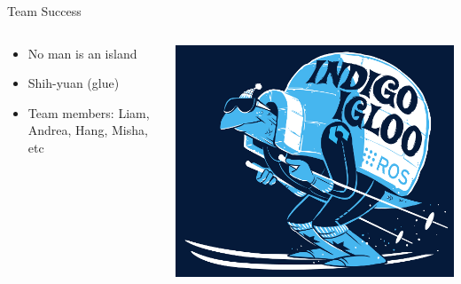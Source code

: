 \documentclass{beamer}
\begin{document}
\begin{frame}{Team Success}
\begin{columns}
	\begin{column}{0.55\textwidth}
		\begin{itemize}
			\item No man is an island
			\item \alert{Shih-yuan} (glue)
\item Team members: Liam, Andrea, Hang, Misha, etc
		\end{itemize}
	\end{column}
	\begin{column}{0.45\textwidth}
		\centering
		\includegraphics[width=\textwidth]{fig/indigoigloo_600.png}
	\end{column}
\end{columns}

\end{frame}
\end{document}
